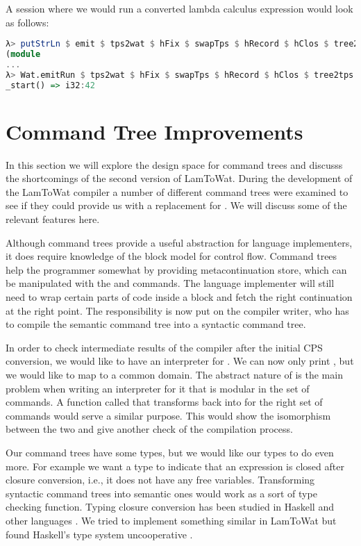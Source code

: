 A  session where we would run a converted lambda calculus expression would look as follows:

\begin{lstlisting}[language=Haskell]
λ> putStrLn $ emit $ tps2wat $ hFix $ swapTps $ hRecord $ hClos $ tree2tps $ lam2tree $ parse "(\\ x -> x + 1) 41"
(module
...
λ> Wat.emitRun $ tps2wat $ hFix $ swapTps $ hRecord $ hClos $ tree2tps $ lam2tree $ parse "(\\ x -> x + 1) 41"
_start() => i32:42
\end{lstlisting}

\section{\label{section:ctreebetter}Command Tree Improvements}
In this section we will explore the design space for command trees and discusss the shortcomings of the second version of LamToWat. During the development of the LamToWat compiler a number of different command trees were examined to see if they could provide us with a replacement for . We will discuss some of the relevant features here.

Although command trees provide a useful abstraction for language implementers, it does require knowledge of the block model for control flow. Command trees help the programmer somewhat by providing metacontinuation store, which can be manipulated with the  and  commands. The language implementer will still need to wrap certain parts of code inside a block and fetch the right continuation at the right point. The responsibility is now put on the compiler writer, who has to compile the semantic command tree into a syntactic command tree.

In order to check intermediate results of the compiler after the initial CPS conversion, we would like to have an interpreter for . We can now only print , but we would like to map  to a common domain. The abstract nature of  is the main problem when writing an interpreter for it that is modular in the set of commands. A function called  that transforms  back into  for the right set of commands would serve a similar purpose. This would show the isomorphism between the two and give another check of the compilation process.

Our command trees have some types, but we would like our types to do even more. For example we want a type to indicate that an expression is closed after closure conversion, i.e., it does not have any free variables. Transforming syntactic command trees into semantic ones would work as a sort of type checking function. Typing closure conversion has been studied in Haskell and other languages \autocite{DBLP:conf/haskell/GuillemetteM07, DBLP:conf/pldi/Chlipala07, DBLP:conf/popl/MorrisettWCG98}. We tried to implement something similar in LamToWat but found Haskell's type system uncooperative \autocite{10.1145/2578854.2503786}.

